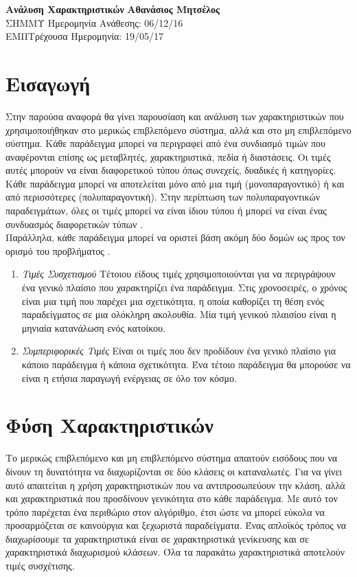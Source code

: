 \documentclass[a4paper, 11pt]{article}
\begin{document}
\noindent
\large\textbf{Ανάλυση Χαρακτηριστικών} \hfill \textbf{Αθανάσιος Μητσέλος} \\
\normalsize ΣΗΜΜΥ \hfill Ημερομηνία Ανάθεσης: 06/12/16  \\
ΕΜΠ\hfill Τρέχουσα Ημερομηνία: 19/05/17 \\


\section{Εισαγωγή}
Στην παρούσα αναφορά θα γίνει παρουσίαση και ανάλυση των χαρακτηριστικών που χρησιμοποιήθηκαν στο μερικώς επιβλεπόμενο σύστημα, αλλά και στο μη επιβλεπόμενο σύστημα. Κάθε παράδειγμα μπορεί να περιγραφεί από ένα συνδιασμό τιμών που αναφέρονται επίσης ως μεταβλητές, χαρακτηριστικά, πεδία ή διαστάσεις. Οι τιμές αυτές μπορούν να είναι διαφορετικού τύπου όπως συνεχείς, δυαδικές ή κατηγορίες. Κάθε παράδειγμα μπορεί να αποτελείται μόνο από μια τιμή (μονοπαραγοντικό) ή και από περισσότερες (πολυπαραγοντική). Στην περίπτωση των πολυπαραγοντικών παραδειγμάτων, όλες οι τιμές μπορεί να είναι ίδιου τύπου ή μπορεί να είναι ένας συνδυασμός διαφορετικών τύπων \cite{Anomaly}.\\
Παράλληλα, κάθε παράδειγμα μπορεί να οριστεί βάση ακόμη δύο δομών ως προς τον ορισμό του προβλήματος \cite{Anomaly}.
\begin{enumerate}
\item{\textit{Τιμές Συσχετισμού}} Τέτοιου είδους τιμές χρησιμοποιούνται για να περιγράψουν ένα γενικό πλαίσιο που χαρακτηρίζει ένα παράδειγμα. Στις χρονοσειρές, ο χρόνος είναι μια τιμή που παρέχει μια σχετικότητα, η οποία καθορίζει τη θέση ενός παραδείγματος σε μια ολόκληρη ακολουθία. Μία τιμή γενικού πλαισίου είναι η μηνιαία κατανάλωση ενός κατοίκου.
\item{\textit{Συμπεριφορικές Τιμές}} Είναι οι τιμές που δεν προδίδουν ένα γενικό πλαίσιο για κάποιο παράδειγμα ή κάποια σχετικότητα. Ένα τέτοιο παράδειγμα θα μπορούσε να είναι η ετήσια παραγωγή ενέργειας σε όλο τον κόσμο.
\end{enumerate}

\section{Φύση Χαρακτηριστικών}
Το μερικώς επιβλεπόμενο και μη επιβλεπόμενο σύστημα απαιτούν εισόδους που να δίνουν τη δυνατότητα να διαχωρίζονται σε δύο κλάσεις οι καταναλωτές. Για να γίνει αυτό απαιτείται η χρήση χαρακτηριστικών που να αντιπροσωπεύουν την κλάση, αλλά και χαρακτηριστικά που προσδίνουν γενικότητα στο κάθε παράδειγμα. Με αυτό τον τρόπο παρέχεται ένα περιθώριο στον αλγόριθμο, έτσι ώστε να μπορεί εύκολα να προσαρμόζεται σε καινούργια και ξεχωριστά παραδείγματα. Ένας απλοϊκός τρόπος να διαχωρίσουμε τα χαρακτηριστικά είναι σε χαρακτηριστικά γενίκευσης και σε χαρακτηριστικά διαχωρισμού κλάσεων. Όλα τα παρακάτω χαρακτηριστικά αποτελούν τιμές συσχέτισης.
\end{document}
